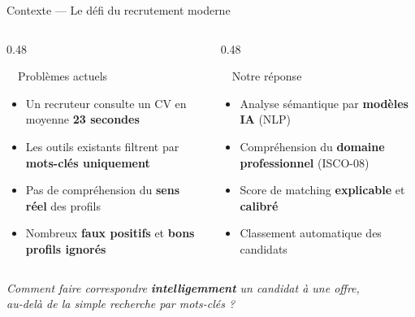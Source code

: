 \documentclass[aspectratio=169]{beamer}
\begin{document}
\begin{frame}{Contexte — Le défi du recrutement moderne}

  \begin{columns}[T]
    \begin{column}{0.48\textwidth}
      \begin{alertblock}{\faExclamationTriangle\ \ Problèmes actuels}
        \begin{itemize}
          \item Un recruteur consulte un CV en moyenne \textbf{23 secondes}
          \item Les outils existants filtrent par \textbf{mots-clés uniquement}
          \item Pas de compréhension du \textbf{sens réel} des profils
          \item Nombreux \textbf{faux positifs} et \textbf{bons profils ignorés}
        \end{itemize}
      \end{alertblock}
    \end{column}
    \begin{column}{0.48\textwidth}
      \begin{exampleblock}{\faLightbulb\ \ Notre réponse}
        \begin{itemize}
          \item Analyse sémantique par \textbf{modèles IA} (NLP)
          \item Compréhension du \textbf{domaine professionnel} (ISCO-08)
          \item Score de matching \textbf{explicable} et \textbf{calibré}
          \item Classement automatique des candidats
        \end{itemize}
      \end{exampleblock}
    \end{column}
  \end{columns}

  \vspace{0.5cm}
  \begin{block}{}
    \centering
    \large
    \textit{Comment faire correspondre \textbf{intelligemment} un candidat à une offre,\\
    au-delà de la simple recherche par mots-clés ?}
  \end{block}

\end{frame}
\end{document}
